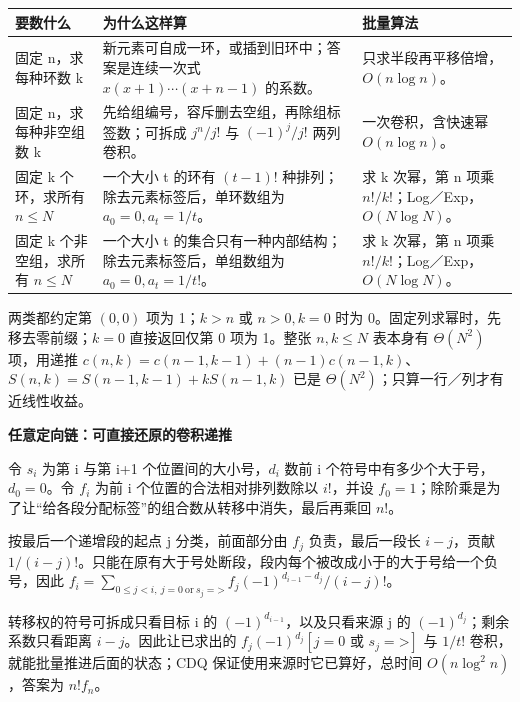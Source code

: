 \documentclass[10pt,a4paper]{article}
\begin{document}
\begin{tabularx}{\linewidth}{>{\raggedright\arraybackslash}p{28mm}>{\raggedright\arraybackslash}X >{\raggedright\arraybackslash}p{40mm}}\toprule
要数什么 & 为什么这样算 & 批量算法\\\midrule
固定 n，求每种环数 k & 新元素可自成一环，或插到旧环中；答案是连续一次式 \(x(x+1)\cdots(x+n-1)\) 的系数。 & 只求半段再平移倍增，\(O(n\log n)\)。\\
固定 n，求每种非空组数 k & 先给组编号，容斥删去空组，再除组标签数；可拆成 \(j^n/j!\) 与 \((-1)^j/j!\) 两列卷积。 & 一次卷积，含快速幂 \(O(n\log n)\)。\\
固定 k 个环，求所有 \(n\le N\) & 一个大小 t 的环有 \((t-1)!\) 种排列；除去元素标签后，单环数组为 \(a_0=0,a_t=1/t\)。 & 求 k 次幂，第 n 项乘 \(n!/k!\)；Log／Exp，\(O(N\log N)\)。\\
固定 k 个非空组，求所有 \(n\le N\) & 一个大小 t 的集合只有一种内部结构；除去元素标签后，单组数组为 \(a_0=0,a_t=1/t!\)。 & 求 k 次幂，第 n 项乘 \(n!/k!\)；Log／Exp，\(O(N\log N)\)。\\
\bottomrule\end{tabularx}\par\vspace{5pt}
两类都约定第 \((0,0)\) 项为 1；\(k>n\) 或 \(n>0,k=0\) 时为 0。固定列求幂时，先移去零前缀；\(k=0\) 直接返回仅第 0 项为 1。整张 \(n,k\le N\) 表本身有 \(\Theta(N^2)\) 项，用递推 \(c(n,k)=c(n-1,k-1)+(n-1)c(n-1,k)\)、\(S(n,k)=S(n-1,k-1)+kS(n-1,k)\) 已是 \(\Theta(N^2)\)；只算一行／列才有近线性收益。\par\vspace{5pt}
\vspace{5pt}\textbf{\color{Accent}任意定向链：可直接还原的卷积递推}\par
令 \(s_i\) 为第 i 与第 i+1 个位置间的大小号，\(d_i\) 数前 i 个符号中有多少个大于号，\(d_0=0\)。令 \(f_i\) 为前 i 个位置的合法相对排列数除以 \(i!\)，并设 \(f_0=1\)；除阶乘是为了让“给各段分配标签”的组合数从转移中消失，最后再乘回 \(n!\)。\par
按最后一个递增段的起点 j 分类，前面部分由 \(f_j\) 负责，最后一段长 \(i-j\)，贡献 \(1/(i-j)!\)。只能在原有大于号处断段，段内每个被改成小于的大于号给一个负号，因此 \(f_i=\sum_{0\le j<i,\ j=0\ \mathrm{or}\ s_j=\texttt{>}}f_j(-1)^{d_{i-1}-d_j}/(i-j)!\)。\par
转移权的符号可拆成只看目标 i 的 \((-1)^{d_{i-1}}\)，以及只看来源 j 的 \((-1)^{d_j}\)；剩余系数只看距离 \(i-j\)。因此让已求出的 \(f_j(-1)^{d_j}[j=0\text{ 或 }s_j=\texttt{>}]\) 与 \(1/t!\) 卷积，就能批量推进后面的状态；CDQ 保证使用来源时它已算好，总时间 \(O(n\log^2n)\)，答案为 \(n!f_n\)。
\endgroup
\end{document}
